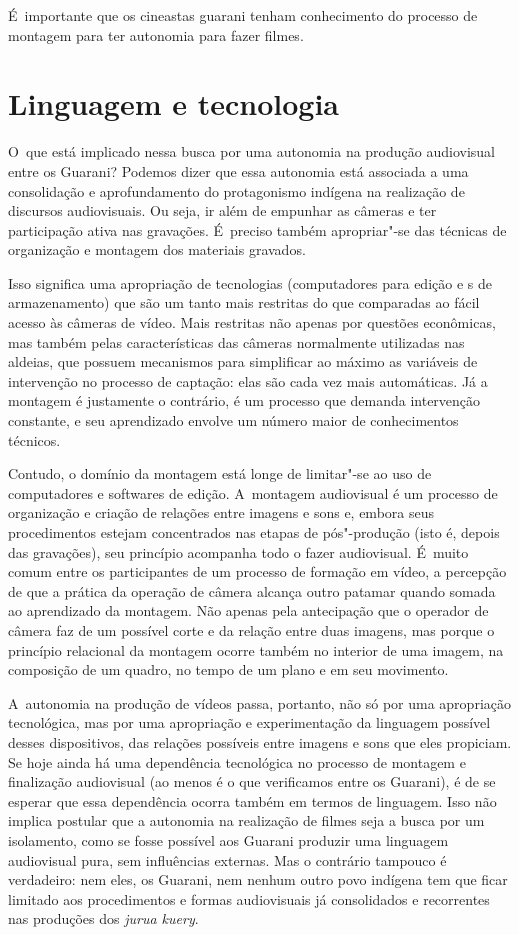 É~importante que os cineastas guarani tenham conhecimento do processo de
montagem para ter autonomia para fazer filmes. 

\section{Linguagem e tecnologia}

O~que está implicado nessa busca por uma autonomia na produção
audiovisual entre os Guarani? Podemos dizer que essa autonomia está
associada a uma consolidação e aprofundamento do protagonismo indígena
na realização de discursos audiovisuais. Ou seja, ir além de empunhar
as câmeras e ter participação ativa nas gravações. É~preciso também
apropriar"-se das técnicas de organização e montagem dos materiais
gravados.

Isso significa uma apropriação de tecnologias (computadores para edição
e s de armazenamento) que são um tanto mais restritas do que
comparadas ao fácil acesso às câmeras de vídeo. Mais restritas não
apenas por questões econômicas, mas também pelas características das
câmeras normalmente utilizadas nas aldeias, que possuem mecanismos para
simplificar ao máximo as variáveis de intervenção no processo de
captação: elas são cada vez mais automáticas. Já a montagem é
justamente o contrário, é um processo que demanda intervenção
constante, e seu aprendizado envolve um número maior de conhecimentos
técnicos.

Contudo, o domínio da montagem está longe de limitar"-se ao uso de
computadores e softwares de edição. A~montagem audiovisual é um
processo de organização e criação de relações entre imagens e sons e,
embora seus procedimentos estejam concentrados nas etapas de
pós"-produção (isto é, depois das gravações), seu princípio acompanha
todo o fazer audiovisual. É~muito comum entre os participantes de um
processo de formação em vídeo, a percepção de que a prática da operação
de câmera alcança outro patamar quando somada ao aprendizado da
montagem. Não apenas pela antecipação que o operador de câmera faz de
um possível corte e da relação entre duas imagens, mas porque o
princípio relacional da montagem ocorre também no interior de uma
imagem, na composição de um quadro, no tempo de um plano e em seu
movimento.

A~autonomia na produção de vídeos passa, portanto, não só por uma
apropriação tecnológica, mas por uma apropriação e experimentação da
linguagem possível desses dispositivos, das relações possíveis entre
imagens e sons que eles propiciam. Se hoje ainda há uma dependência
tecnológica no processo de montagem e finalização audiovisual (ao menos
é o que verificamos entre os Guarani), é de se esperar que essa
dependência ocorra também em termos de linguagem. Isso não implica
postular que a autonomia na realização de filmes seja a busca por um
isolamento, como se fosse possível aos Guarani produzir uma linguagem
audiovisual pura, sem influências externas. Mas o contrário tampouco é
verdadeiro: nem eles, os Guarani, nem nenhum outro povo indígena tem
que ficar limitado aos procedimentos e formas audiovisuais já
consolidados e recorrentes nas produções dos \emph{jurua kuery}.

